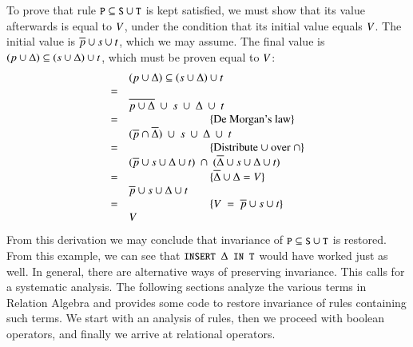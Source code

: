 \documentclass{elsarticle}
\begin{document}
	To prove that rule $\text{\tt\small P}\subseteq\text{\tt\small S}\cup\text{\tt\small T}$ is kept satisfied,
	we must show that its value afterwards is equal to $V$,
	under the condition that its initial value equals $V$.
	The initial value is $\overline{p}\cup s\cup t$, which we may assume.
	The final value is $(p\cup\Delta)\subseteq(s\cup\Delta)\cup t$, which must be proven equal to $V$:
\[\begin{array}{cl}
&(p\cup\Delta)\subseteq(s\cup\Delta)\cup t\\
=&\\
&\overline{p\cup\Delta}\ \cup\ s\ \cup\ \Delta\ \cup\ t\\
=&\hspace{1in}\{\hbox{De Morgan's law}\}\\
&(\overline{p}\cap\overline{\Delta})\ \cup\ s\ \cup\ \Delta\ \cup\ t\\
=&\hspace{1in}\{\hbox{Distribute $\cup$ over $\cap$}\}\\
&(\overline{p}\cup s\cup\Delta\cup t)\ \cap\ (\overline{\Delta}\cup s\cup\Delta\cup t)\\
=&\hspace{1in}\{\overline{\Delta}\cup\Delta=V\}\\
&\overline{p}\cup s\cup\Delta\cup t\\
=&\hspace{1in}\{V\ =\ \overline{p}\cup s\cup t\}\\
&V
\end{array}\]
	From this derivation we may conclude that invariance of $\text{\tt\small P}\subseteq\text{\tt\small S}\cup\text{\tt\small T}$ is restored.
	From this example, we can see that $\code{INSERT }\Delta\code{ IN T}$ would have worked just as well.
	In general, there are alternative ways of preserving invariance.
	This calls for a systematic analysis.
	The following sections analyze the various terms in Relation Algebra and provides some code to restore invariance of rules containing such terms.
	We start with an analysis of rules, then we proceed with boolean operators, and finally we arrive at relational operators.
\end{document}
